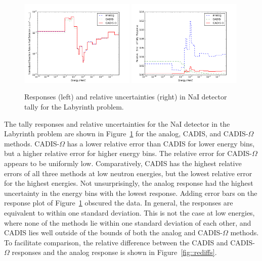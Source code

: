 \documentclass[12pt]{article}
\begin{document}
\begin{figure}
  \begin{center}
    \includegraphics[width=0.49\textwidth]{./images/response.png}
    \includegraphics[width=0.49\textwidth]{./images/response_RE.png}
    \caption[]{\label{fig::tallyresponse} Responses (left) and relative uncertainties (right) in NaI detector tally for the Labyrinth problem. }
  \end{center}
\end{figure}

The tally responses and relative uncertainties for the NaI detector in the Labyrinth problem are shown in Figure~\ref{fig::tallyresponse} for the analog, CADIS, and CADIS-$\Omega$ methods.  CADIS-$\Omega$ has a lower relative error than CADIS for lower energy bins, but a higher relative error for higher energy bins. The relative error for CADIS-$\Omega$ appears to be uniformly low. Comparatively, CADIS has the highest relative errors of all three methods at low neutron energies, but the lowest relative error for the highest energies. Not unsurprisingly, the analog response had the highest uncertainty in the energy bins with the lowest response. Adding error bars on the response plot of Figure~\ref{fig::tallyresponse} obscured the data. In general, the responses are equivalent to within one standard deviation. This is not the case at low energies, where none of the methods lie within one standard deviation of each other, and CADIS lies well outside of the bounds of both the analog and CADIS-$\Omega$ methods. 
To facilitate comparison, the relative difference between the CADIS and CADIS-$\Omega$ responses and the analog response is shown in Figure~\ref{fig::rediffs}. 
\end{document}
